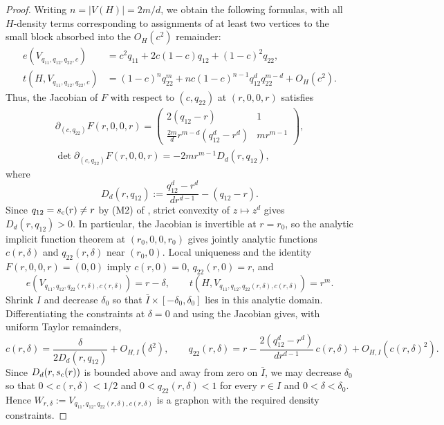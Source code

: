 \begin{proof}
Writing $n=|V(H)|=2m/d$, we obtain the following formulas, with all $H$-density terms
corresponding to assignments of at least two vertices to the small block
absorbed into the $O_H(c^2)$ remainder:
\begin{align*}
  e(V_{q_{11},q_{12},q_{22},c})
  &=c^2q_{11}+2c(1-c)q_{12}+(1-c)^2q_{22},\\
  t(H,V_{q_{11},q_{12},q_{22},c})
  &=(1-c)^nq_{22}^m
  +nc(1-c)^{n-1}q_{12}^dq_{22}^{m-d}+O_H(c^2).
\end{align*}
Thus, the Jacobian of $F$ with respect to $(c,q_{22})$ at $(r,0,0,r)$ satisfies
\begin{gather*}
  \partial_{(c,q_{22})}F(r,0,0,r)=
  \begin{pmatrix}
    2(q_{12}-r) & 1 \\
    \frac{2m}{d}r^{m-d}(q_{12}^d-r^d) & m r^{m-1}
  \end{pmatrix},\\
  \det\partial_{(c,q_{22})}F(r,0,0,r)=-2m r^{m-1}D_d(r,q_{12}),
\end{gather*}
where
\[
  D_d(r,q_{12}):=\frac{q_{12}^d-r^d}{d r^{d-1}}-(q_{12}-r).
\]
Since $q_{12}=\sc(r)\ne r$ by (M2) of ,
strict convexity of $z\mapsto z^d$ gives $D_d(r,q_{12})>0$.
In particular, the Jacobian is invertible at $r=r_0$, so the analytic implicit
function theorem at $(r_0,0,0,r_0)$ gives jointly analytic functions
$c(r,\delta)$ and $q_{22}(r,\delta)$ near $(r_0,0)$.
Local uniqueness and the identity $F(r,0,0,r)=(0,0)$ imply
$c(r,0)=0$, $q_{22}(r,0)=r$, and
\begin{equation}\label{eq:comparison-graphon-constraints}
  e(V_{q_{11},q_{12},q_{22}(r,\delta),c(r,\delta)})=r-\delta,
  \qquad
  t(H,V_{q_{11},q_{12},q_{22}(r,\delta),c(r,\delta)})=r^m.
\end{equation}
Shrink $I$ and decrease $\delta_0$ so that
$\bar I\times[-\delta_0,\delta_0]$ lies in this analytic domain.
Differentiating the constraints at $\delta=0$ and using the Jacobian gives,
with uniform Taylor remainders,
\begin{equation}\label{eq:expansion-cq}
  c(r,\delta)=\frac{\delta}{2D_d(r,q_{12})}+O_{H,I}(\delta^2),
  \qquad
  q_{22}(r,\delta)=r-\frac{2(q_{12}^d-r^d)}{d r^{d-1}}\,c(r,\delta)+O_{H,I}(c(r,\delta)^2).
\end{equation}
Since $D_d(r,\sc(r))$ is bounded above and away from zero on $\bar I$,
we may decrease $\delta_0$ so that $0<c(r,\delta)<1/2$ and $0<q_{22}(r,\delta)<1$
for every $r\in I$ and $0<\delta<\delta_0$.
Hence $W_{r,\delta}:=V_{q_{11},q_{12},q_{22}(r,\delta),c(r,\delta)}$ is a graphon
with the required density constraints.


\end{proof}
